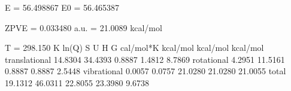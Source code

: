 \documentclass[letterpaper,10pt,english,openany,oneside]{sphinxmanual}
\begin{document}
\begin{sphinxVerbatim}[commandchars=\\\{\}]
 E =   \PYGZhy{}56.498867    E0 =   \PYGZhy{}56.465387

 ZPVE = 0.033480 a.u. =   21.0089 kcal/mol

 \PYGZhy{}\PYGZhy{}\PYGZhy{}\PYGZhy{}\PYGZhy{}\PYGZhy{}\PYGZhy{}\PYGZhy{}\PYGZhy{}\PYGZhy{}\PYGZhy{}\PYGZhy{}\PYGZhy{}\PYGZhy{}\PYGZhy{}\PYGZhy{}\PYGZhy{}\PYGZhy{}\PYGZhy{}\PYGZhy{}\PYGZhy{}\PYGZhy{}\PYGZhy{}\PYGZhy{}\PYGZhy{}\PYGZhy{}\PYGZhy{}\PYGZhy{}\PYGZhy{}\PYGZhy{}\PYGZhy{}\PYGZhy{}\PYGZhy{}\PYGZhy{}\PYGZhy{}\PYGZhy{}\PYGZhy{}\PYGZhy{}\PYGZhy{}\PYGZhy{}\PYGZhy{}\PYGZhy{}\PYGZhy{}\PYGZhy{}\PYGZhy{}\PYGZhy{}\PYGZhy{}\PYGZhy{}\PYGZhy{}\PYGZhy{}\PYGZhy{}\PYGZhy{}\PYGZhy{}\PYGZhy{}\PYGZhy{}\PYGZhy{}\PYGZhy{}\PYGZhy{}\PYGZhy{}\PYGZhy{}\PYGZhy{}\PYGZhy{}\PYGZhy{}\PYGZhy{}\PYGZhy{}\PYGZhy{}\PYGZhy{}\PYGZhy{}\PYGZhy{}\PYGZhy{}
 T =  298.150 K      ln(Q)       S          U          H          G
                              cal/mol*K  kcal/mol   kcal/mol   kcal/mol
 \PYGZhy{}\PYGZhy{}\PYGZhy{}\PYGZhy{}\PYGZhy{}\PYGZhy{}\PYGZhy{}\PYGZhy{}\PYGZhy{}\PYGZhy{}\PYGZhy{}\PYGZhy{}\PYGZhy{}\PYGZhy{}\PYGZhy{}\PYGZhy{}\PYGZhy{}\PYGZhy{}\PYGZhy{}\PYGZhy{}\PYGZhy{}\PYGZhy{}\PYGZhy{}\PYGZhy{}\PYGZhy{}\PYGZhy{}\PYGZhy{}\PYGZhy{}\PYGZhy{}\PYGZhy{}\PYGZhy{}\PYGZhy{}\PYGZhy{}\PYGZhy{}\PYGZhy{}\PYGZhy{}\PYGZhy{}\PYGZhy{}\PYGZhy{}\PYGZhy{}\PYGZhy{}\PYGZhy{}\PYGZhy{}\PYGZhy{}\PYGZhy{}\PYGZhy{}\PYGZhy{}\PYGZhy{}\PYGZhy{}\PYGZhy{}\PYGZhy{}\PYGZhy{}\PYGZhy{}\PYGZhy{}\PYGZhy{}\PYGZhy{}\PYGZhy{}\PYGZhy{}\PYGZhy{}\PYGZhy{}\PYGZhy{}\PYGZhy{}\PYGZhy{}\PYGZhy{}\PYGZhy{}\PYGZhy{}\PYGZhy{}\PYGZhy{}\PYGZhy{}\PYGZhy{}
 translational      14.8304    34.4393     0.8887     1.4812    \PYGZhy{}8.7869
 rotational          4.2951    11.5161     0.8887     0.8887    \PYGZhy{}2.5448
 vibrational         0.0057     0.0757    21.0280    21.0280    21.0055
 total              19.1312    46.0311    22.8055    23.3980     9.6738
 \PYGZhy{}\PYGZhy{}\PYGZhy{}\PYGZhy{}\PYGZhy{}\PYGZhy{}\PYGZhy{}\PYGZhy{}\PYGZhy{}\PYGZhy{}\PYGZhy{}\PYGZhy{}\PYGZhy{}\PYGZhy{}\PYGZhy{}\PYGZhy{}\PYGZhy{}\PYGZhy{}\PYGZhy{}\PYGZhy{}\PYGZhy{}\PYGZhy{}\PYGZhy{}\PYGZhy{}\PYGZhy{}\PYGZhy{}\PYGZhy{}\PYGZhy{}\PYGZhy{}\PYGZhy{}\PYGZhy{}\PYGZhy{}\PYGZhy{}\PYGZhy{}\PYGZhy{}\PYGZhy{}\PYGZhy{}\PYGZhy{}\PYGZhy{}\PYGZhy{}\PYGZhy{}\PYGZhy{}\PYGZhy{}\PYGZhy{}\PYGZhy{}\PYGZhy{}\PYGZhy{}\PYGZhy{}\PYGZhy{}\PYGZhy{}\PYGZhy{}\PYGZhy{}\PYGZhy{}\PYGZhy{}\PYGZhy{}\PYGZhy{}\PYGZhy{}\PYGZhy{}\PYGZhy{}\PYGZhy{}\PYGZhy{}\PYGZhy{}\PYGZhy{}\PYGZhy{}\PYGZhy{}\PYGZhy{}\PYGZhy{}\PYGZhy{}\PYGZhy{}\PYGZhy{}
\end{sphinxVerbatim}
\end{document}

